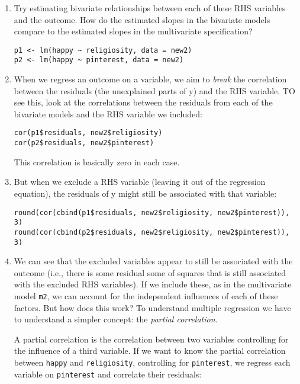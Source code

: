 \documentclass[a4paper,12pt]{article}
\begin{document}
\begin{enumerate}
\item Try estimating bivariate relationships between each of these RHS variables and the outcome. How do the estimated slopes in the bivariate models compare to the estimated slopes in the multivariate specification?

\begin{verbatim}
p1 <- lm(happy ~ religiosity, data = new2)
p2 <- lm(happy ~ pinterest, data = new2)
\end{verbatim}

\item When we regress an outcome on a variable, we aim to \textit{break} the correlation between the residuals (the unexplained parts of y) and the RHS variable. TO see this, look at the correlations between the residuals from each of the bivariate models and the RHS variable we included:

\begin{verbatim}
cor(p1$residuals, new2$religiosity)
cor(p2$residuals, new2$pinterest)
\end{verbatim}

\noindent This correlation is basically zero in each case.

\item But when we exclude a RHS variable (leaving it out of the regression equation), the residuals of y might still be associated with that variable:

\begin{verbatim}
round(cor(cbind(p1$residuals, new2$religiosity, new2$pinterest)), 3)
round(cor(cbind(p2$residuals, new2$religiosity, new2$pinterest)), 3)
\end{verbatim}

\item We can see that the excluded variables appear to still be associated with the outcome (i.e., there is some residual some of squares that is still associated with the excluded RHS variables). If we include these, as in the multivariate model \texttt{m2}, we can account for the independent influences of each of these factors. But how does this work? To understand multiple regression we have to understand a simpler concept: the \textit{partial correlation}.

A partial correlation is the correlation between two variables controlling for the influence of a third variable. If we want to know the partial correlation between \texttt{happy} and \texttt{religiosity}, controlling for \texttt{pinterest}, we regress each variable on \texttt{pinterest} and correlate their residuals:


\end{enumerate}
\end{document}

